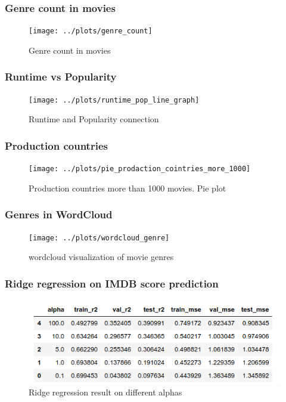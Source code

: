 \documentclass{beamer}
\begin{document}
\begin{frame}
\frametitle{Genre count in movies}

\begin{figure}

	\centering
	\texttt{[image: ../plots/genre\_count]}
	\caption{Genre count in movies}
	\label{fig:genre_count}
	
\end{figure}

\end{frame}

\begin{frame}
\frametitle{Runtime vs Popularity}

\begin{figure}
	
	\centering
	\texttt{[image: ../plots/runtime\_pop\_line\_graph]}
	\caption{Runtime and Popularity connection}
	\label{fig:runtime_vs_pop}
	
\end{figure}

\end{frame}

\begin{frame}
\frametitle{Production countries}

\begin{figure}
	
	\centering
	\texttt{[image: ../plots/pie\_prodaction\_cointries\_more\_1000]}
	\caption{Production countries more than 1000 movies. Pie plot}
	\label{fig:production_countries}
	
\end{figure}

\end{frame}


\begin{frame}
\frametitle{Genres in WordCloud}

\begin{figure}
	
	\centering
	\texttt{[image: ../plots/wordcloud\_genre]}
	\caption{wordcloud visualization of movie genres}
	\label{fig:genres}
	
\end{figure}

\end{frame}

\begin{frame}

\frametitle{Ridge regression on IMDB score prediction}
\begin{figure}
	\centering
	\includegraphics[width=1\linewidth]{res}
	\caption{Ridge regression result on different alphas}
	\label{fig:res}
\end{figure}


\end{frame}
\end{document}
